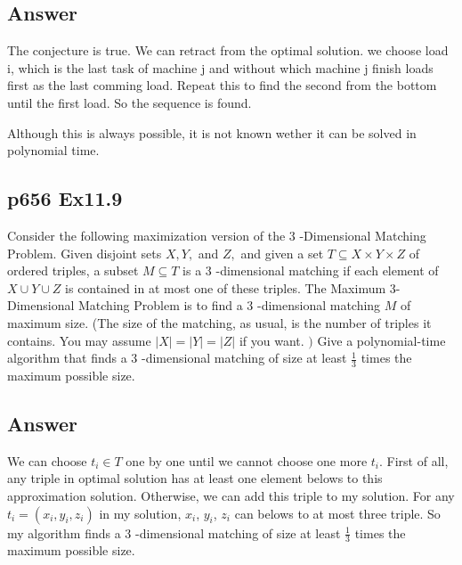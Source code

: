 \documentclass[a4paper]{article}
\begin{document}
\subsection*{Answer}
The conjecture is true. We can retract from the optimal solution. we choose load i, which is the last task of machine j and without which machine j finish loads first as the last comming load. Repeat this to find the second from the bottom until the first load. So the sequence is found.

Although this is always possible, it is not known wether it can be solved in polynomial time.
\vspace*{2cm}


\subsection*{p656 Ex11.9}
\begin{adjustwidth}{1cm}{1cm}
	Consider the following maximization version of the 3 -Dimensional Matching Problem. Given disjoint sets $X, Y,$ and $Z,$ and given a set $T \subseteq X \times Y \times Z$ of ordered triples, a subset $M \subseteq T$ is a 3 -dimensional matching if each element of $X \cup Y \cup Z$ is contained in at most one of these triples. The Maximum 3-Dimensional Matching Problem is to find a 3 -dimensional matching $M$ of maximum size. (The size of the matching, as usual, is the number of triples it contains. You may assume $|X|=|Y|=|Z|$ if you want. $)$
	Give a polynomial-time algorithm that finds a 3 -dimensional matching of size at least $\frac{1}{3}$ times the maximum possible size.
\end{adjustwidth}
\subsection*{Answer}
We can choose $t_i \in T$ one by one until we cannot choose one more $t_i$. First of all, any triple in optimal solution has at least one element belows to this approximation solution. Otherwise, we can add this triple to my solution. For any $t_i = (x_i,y_i,z_i)$ in my solution, $x_i$, $y_i$, $z_i$ can belows to at most three triple. So my algorithm finds a 3 -dimensional matching of size at least $\frac{1}{3}$ times the maximum possible size.

\end{document}
